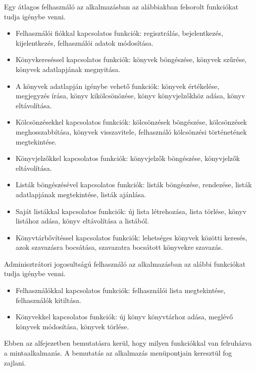 Egy átlagos felhasználó az alkalmazásban az alábbiakban felsorolt funkciókat tudja igénybe venni.
\begin{itemize}
    \item Felhasználói fiókkal kapcsolatos funkciók: regisztrálás, bejelentkezés, kijelentkezés, felhasználói adatok módosítása.
    \item Könyvkereséssel kapcsolatos funkciók: könyvek böngészése, könyvek szűrése, \\ könyvek adatlapjának megnyitása.
    \item A könyvek adatlapján igénybe vehető funkciók: könyvek értékelése, megjegyzés írása, könyv kikölcsönözése, könyv könyvjelzőkhöz adása, könyv eltávolítása.
    \item Kölcsönzésekkel kapcsolatos funkciók: kölcsönzések böngészése, kölcsönzések \\ meghosszabbítása, könyvek visszavitele, felhasználó kölcsönzési történetének \\ megtekintése.
    \item Könyvjelzőkkel kapcsolatos funkciók: könyvjelzők böngészése, könyvjelzők eltávolítása.
    \item Listák böngészésével kapcsolatos funkciók: listák böngészése, rendezése, listák adatlapjának megtekintése, listák ajánlása.
    \item Saját listákkal kapcsolatos funkciók: új lista létrehozása, lista törlése, könyv listához adása, könyv eltávolítása a listából.
    \item Könyvtárbővítéssel kapcsolatos funkciók: lehetséges könyvek közötti keresés, azok szavazásra bocsátása, szavazatra bocsátott könyvekre szavazás.
\end{itemize}

Adminisztrátori jogosultságú felhasználó az alkalmazásban az alábbi funkciókat tudja igénybe venni.
\begin{itemize}
    \item Felhasználókkal kapcsolatos funkciók: felhasználói lista megtekintése, felhasználók kitiltása.
    \item Könyvekkel kapcsolatos funkciók: új könyv könyvtárhoz adása, meglévő könyvek módosítása, könyvek törlése.
\end{itemize}



Ebben az alfejezetben bemutatásra kerül, hogy milyen funkciókkal van felruházva a mintaalkalmazás. A bemutatás az alkalmazás menüpontjain keresztül fog zajlani.

